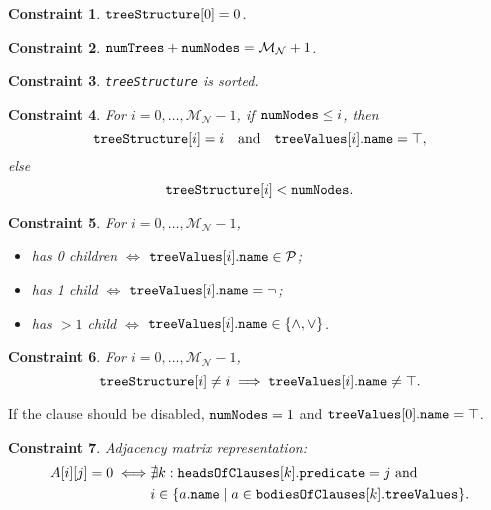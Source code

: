 \documentclass[runningheads]{llncs}
\newtheorem{constraint}{Constraint}
\newcommand{\variable}[1]{\texttt{\textup{#1}}}
\newcommand{\predicates}{\mathcal{P}}
\newcommand{\maxNumNodes}{\mathcal{M}_{\mathcal{N}}}
\begin{document}
\begin{constraint}
  $\variable{treeStructure}[0] = 0$.
\end{constraint}

\begin{constraint}
  $\variable{numTrees} + \variable{numNodes} = \maxNumNodes{} + 1$.
\end{constraint}

\begin{constraint}
  \variable{treeStructure} is sorted.
\end{constraint}

\begin{constraint}
  For $i = 0, \dots, \maxNumNodes{} - 1$, if $\variable{numNodes} \le
  i$, then
  \[
    \variable{treeStructure}[i] = i \quad \text{and} \quad
    \variable{treeValues}[i].\variable{name} = \top,
  \]
  else
  \[
    \variable{treeStructure}[i] < \variable{numNodes}.
  \]
\end{constraint}

\begin{constraint}
  For $i = 0, \dots, \maxNumNodes{} - 1$,
  \begin{itemize}
  \item has 0 children $\iff$ $\variable{treeValues}[i].\variable{name} \in
    \predicates{}$;
  \item has 1 child $\iff$ $\variable{treeValues}[i].\variable{name} = \neg$;
  \item has $>1$ child $\iff$ $\variable{treeValues}[i].\variable{name} \in
    \{ \land, \lor \}$.
  \end{itemize}
\end{constraint}

\begin{constraint}
  For $i = 0, \dots, \maxNumNodes{} - 1$,
  \[
    \variable{treeStructure}[i] \ne i \implies
    \variable{treeValues}[i].\variable{name} \ne \top.
  \]
\end{constraint}

If the clause should be disabled, $\variable{numNodes} = 1$ and
$\variable{treeValues}[0].\variable{name} = \top$.

\begin{constraint}
  Adjacency matrix representation:
  \begin{align*}
    A[i][j] = 0 \iff &\nexists k: \variable{headsOfClauses}[k].\variable{predicate} = j \text{ and } \\
    &i \in \{ a.\variable{name} \mid a \in \variable{bodiesOfClauses}[k].\variable{treeValues} \}.
  \end{align*}
\end{constraint}
\end{document}
